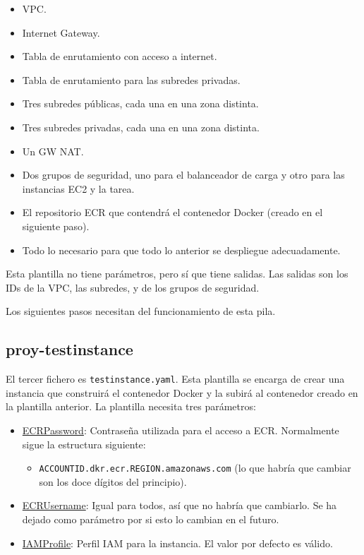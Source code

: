 \begin{itemize}
    \item VPC.
    \item Internet Gateway.
    \item Tabla de enrutamiento con acceso a internet.
    \item Tabla de enrutamiento para las subredes privadas.
    \item Tres subredes públicas, cada una en una zona distinta.
    \item Tres subredes privadas, cada una en una zona distinta.
    \item Un GW NAT.
    \item Dos grupos de seguridad, uno para el balanceador de carga y otro para las instancias EC2 y la tarea.
    \item El repositorio ECR que contendrá el contenedor Docker (creado en el siguiente paso).
    \item Todo lo necesario para que todo lo anterior se despliegue adecuadamente.
\end{itemize}

Esta plantilla no tiene parámetros, pero sí que tiene salidas. Las salidas son los IDs de la VPC, las subredes, y de los grupos de seguridad.

Los siguientes pasos necesitan del funcionamiento de esta pila.

\subsection{proy-testinstance}

El tercer fichero es \texttt{testinstance.yaml}. Esta plantilla se encarga de crear una instancia que construirá el contenedor Docker y la subirá al contenedor creado en la plantilla anterior. La plantilla necesita tres parámetros:

\begin{itemize}
    \item \underline{ECRPassword}: Contraseña utilizada para el acceso a ECR. Normalmente sigue la estructura siguiente:
    \begin{itemize}
        \item \texttt{ACCOUNTID.dkr.ecr.REGION.amazonaws.com} (lo que habría que cambiar son los doce dígitos del principio).
    \end{itemize}
    \item \underline{ECRUsername}: Igual para todos, así que no habría que cambiarlo. Se ha dejado como parámetro por si esto lo cambian en el futuro.
    \item \underline{IAMProfile}: Perfil IAM para la instancia. El valor por defecto es válido.
\end{itemize}


